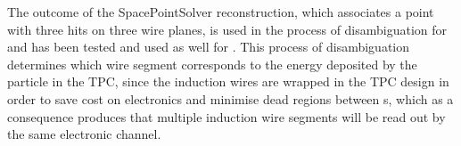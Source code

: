 The outcome of the SpacePointSolver reconstruction, which associates a \threed point with three hits on three wire planes, is used in the process of disambiguation for  and has been tested and used as well for . This process of disambiguation determines which wire segment corresponds to the energy deposited by the particle in the TPC, since the induction wires are wrapped in the  TPC design in order to save cost on electronics and minimise dead regions between s, which as a consequence produces that multiple induction wire segments will be read out by the same electronic channel.




